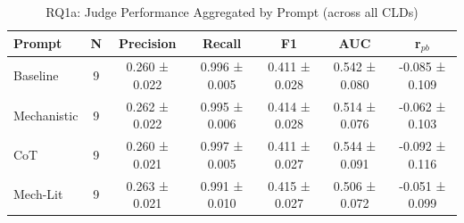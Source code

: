 \begin{table}[htbp]
\centering
\caption{RQ1a: Judge Performance Aggregated by Prompt (across all CLDs)}
\label{tab:rq1a_by_prompt}
\begin{tabular}{lcccccc}
\toprule
\textbf{Prompt} & \textbf{N} & \textbf{Precision} & \textbf{Recall} & \textbf{F1} & \textbf{AUC} & \textbf{r$_{pb}$} \\
\midrule
Baseline & 9 & 0.260 ± 0.022 & 0.996 ± 0.005 & 0.411 ± 0.028 & 0.542 ± 0.080 & -0.085 ± 0.109 \\
Mechanistic & 9 & 0.262 ± 0.022 & 0.995 ± 0.006 & 0.414 ± 0.028 & 0.514 ± 0.076 & -0.062 ± 0.103 \\
CoT & 9 & 0.260 ± 0.021 & 0.997 ± 0.005 & 0.411 ± 0.027 & 0.544 ± 0.091 & -0.092 ± 0.116 \\
Mech-Lit & 9 & 0.263 ± 0.021 & 0.991 ± 0.010 & 0.415 ± 0.027 & 0.506 ± 0.072 & -0.051 ± 0.099 \\
\bottomrule
\end{tabular}
\end{table}